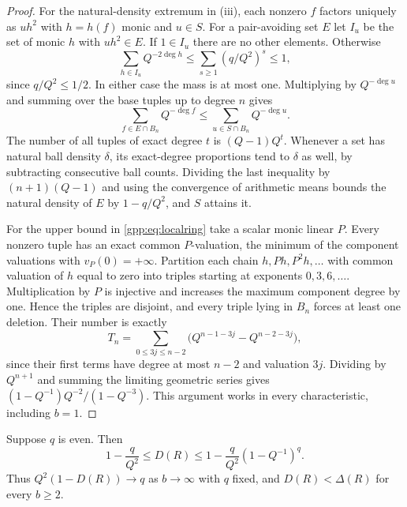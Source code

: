 \begin{proof}
For the natural-density extremum in (iii), each nonzero $f$ factors uniquely as $uh^2$
with $h=h(f)$ monic and $u\in S$. For a pair-avoiding set $E$ let $I_u$ be the set of
monic $h$ with $uh^2\in E$. If $1\in I_u$ there are no other elements. Otherwise
\[
 \sum_{h\in I_u}Q^{-2\deg h}\le\sum_{s\ge1}(q/Q^2)^s\le1,
\]
since $q/Q^2\le1/2$. In either case the mass is at most one. Multiplying by
$Q^{-\deg u}$ and summing over the base tuples up to degree $n$ gives
\[
 \sum_{f\in E\cap B_n}Q^{-\deg f}\le\sum_{u\in S\cap B_n}Q^{-\deg u}.
\]
The number of all tuples of exact degree $t$ is $(Q-1)Q^t$. Whenever a set has natural
ball density $\delta$, its exact-degree proportions tend to $\delta$ as well, by
subtracting consecutive ball counts. Dividing the last inequality by $(n+1)(Q-1)$ and
using the convergence of arithmetic means bounds the natural density of $E$ by
$1-q/Q^2$, and $S$ attains it.

For the upper bound in \eqref{gpp:eq:localring} take a scalar monic linear $P$. Every
nonzero tuple has an exact common $P$-valuation, the minimum of the component valuations
with $v_P(0)=+\infty$. Partition each chain $h,Ph,P^2h,\ldots$ with common valuation of
$h$ equal to zero into triples starting at exponents $0,3,6,\ldots$. Multiplication by
$P$ is injective and increases the maximum component degree by one. Hence the triples
are disjoint, and every triple lying in $B_n$ forces at least one deletion. Their number
is exactly
\[
 T_n=\sum_{0\le3j\le n-2}\bigl(Q^{n-1-3j}-Q^{n-2-3j}\bigr),
\]
since their first terms have degree at most $n-2$ and valuation $3j$. Dividing by
$Q^{n+1}$ and summing the limiting geometric series gives
$(1-Q^{-1})Q^{-2}/(1-Q^{-3})$. This argument works in every characteristic, including
$b=1$.
\end{proof}

\begin{theorem}\label{gpp:thm:gaprings}
Suppose $q$ is even. Then
\[
 1-\frac q{Q^2}\le D(R)\le1-\frac q{Q^2}(1-Q^{-1})^q .
\]
Thus $Q^2(1-D(R))\to q$ as $b\to\infty$ with $q$ fixed, and $D(R)<\Delta(R)$ for every
$b\ge2$.
\end{theorem}

